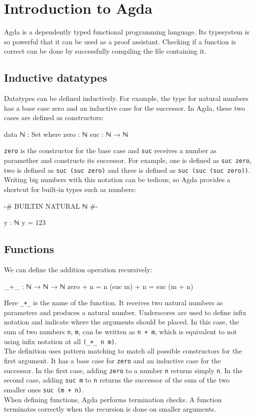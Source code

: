 
\chapter{Introduction to Agda}
Agda is a dependently typed functional programming language. Its typesystem is so powerful that it can be used as a proof assistant. Checking if a function is correct can be done by successfully compiling the file containing it.

\section{Inductive datatypes}
Datatypes can be defined inductively. For example, the type for natural numbers has a base case zero and an inductive case for the successor. In Agda, these two cases are defined as constructors:
\begin{agda}
data ℕ : Set where
  zero : ℕ
  suc  : ℕ → ℕ
\end{agda}
\texttt{zero} is the constructor for the base case and \texttt{suc} receives a number as paramether and constructs its successor. For example, one is defined as \texttt{suc zero}, two is defined as \texttt{suc (suc zero)} and three is defined as \texttt{suc (suc (suc zero))}.\\
Writing big numbers with this notation can be tedious, so Agda provides a shortcut for built-in types such as numbers:
\begin{agda}
{-# BUILTIN NATURAL ℕ #-}

y : ℕ
y = 123
\end{agda}
\section{Functions}
We can define the addition operation recursively:
\begin{agda}
_+_ : ℕ → ℕ → ℕ
zero + n = n
(suc m) + n = suc (m + n)
\end{agda}
Here \texttt{\_+\_} is the name of the function. It receives two natural numbers as parameters and produces a natural number. Underscores are used to define infix notation and indicate where the arguments should be placed. In this case, the sum of two numbers \texttt{n}, \texttt{m}, can be written as \texttt{n + m}, which is equivalent to not using infix notation at all \texttt{(\_+\_ n m)}.\\
The definition uses pattern matching to match all possible constructors for the first argument. It has a base case for \texttt{zero} and an inductive case for the successor. In the first case, adding \texttt{zero} to a number \texttt{n} returns simply \texttt{n}. In the second case, adding \texttt{suc m} to \texttt{n} returns the successor of the sum of the two smaller ones \texttt{suc (m + n)}.\\ 
When defining functions, Agda performs termination checks. A function terminates correctly when the recursion is done on smaller arguments. 

